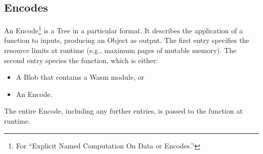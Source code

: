 \documentclass{article}
\newcommand{\blob}{\textrm{Blob}\xspace}
\newcommand{\object}{\textrm{Object}\xspace}
\newcommand{\encode}{\textrm{Encode}\xspace}
\newcommand{\encodes}{\textrm{Encode}s\xspace}
\newcommand{\tree}{\textrm{Tree}\xspace}
\begin{document}
\subsection{\encodes}

An \encode\footnote{For ``Explicit Named Computation On Data or
\encodes.''} is a \tree in a particular format. It describes the
application of a function to inputs, producing an \object as
output. The first entry specifies the resource limits at runtime
(e.g., maximum pages of mutable memory). The second entry species the
function, which is either:
\begin{itemize}[itemsep=0pt]
\item A \blob that contains a Wasm module, or
\item An \encode.
\end{itemize}

The entire \encode, including any further entries, is passed to the function at runtime.
\end{document}
